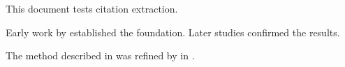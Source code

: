 \documentclass{article}
\begin{document}
This document tests citation extraction.

Early work by \cite{smith2020} established the foundation.
Later studies \citep{jones2021,brown2022} confirmed the results.

The method described in \citet{smith2020} was refined by \citeauthor{jones2021}
in \citeyear{jones2021}.



\end{document}
